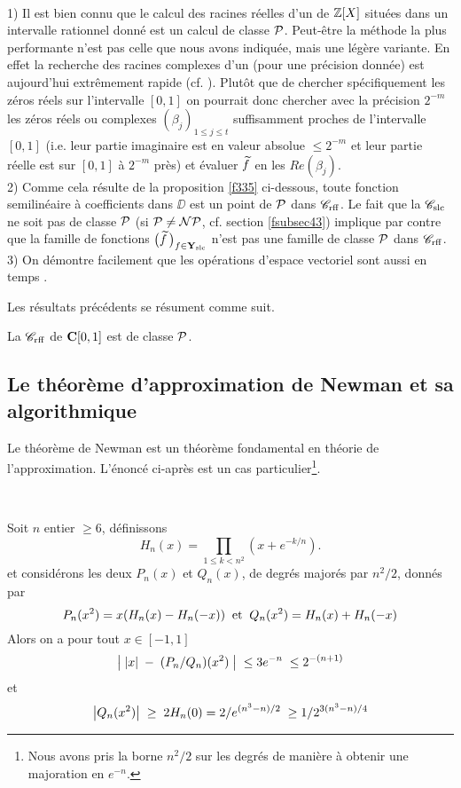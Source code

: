 \begin{fremarks} \label{f328}~\\
1)	Il est bien connu que le calcul des racines réelles d'un \pol de  
$\mathbb {Z}[X]$  situées dans un intervalle rationnel donné est un calcul de 
classe  ${\cal P}$. Peut-être la méthode la plus performante n'est pas celle que 
nous avons indiquée, mais une légère variante. 
En effet la recherche des 
racines complexes d'un \pol (pour une précision donnée) est aujourd'hui 
extrêmement rapide (cf. \cite {fPa}). 
Plutôt que de chercher spécifiquement les zéros réels sur l'intervalle $[0,1]$ on pourrait donc chercher avec la précision  $2^{-m}$  les zéros réels ou complexes  $(\beta_j)_{1 \leq j \leq t}$ suffisamment proches de l'intervalle   $[0,1]$    (i.e. leur partie imaginaire est en valeur absolue  $\leq2^{-m}$ et leur partie réelle est sur  $[0,1]$  à   $2^{-m}$  près) et évaluer $\widetilde{f}$ en les  $Re(\beta_j)$.\\    
2) Comme cela résulte de la proposition \ref{f335} ci-dessous,  toute 
fonction semilinéaire à coefficients dans $\DD$  est un point de \com  
${\cal P}$ dans ${{{\mathscr C}}_{\rm rff}}$. 
Le fait que la \pres ${{{\mathscr C}}_{\rm slc}}$ ne soit pas de classe  ${\cal P}$ (si ${\cal P}\neq{\cal NP}$, cf. section \ref{fsubsec43}) implique par contre que la famille de fonctions $\big(\widetilde{f}\,\big)_{f \in {{\bf Y}_{\rm slc}} }$ n'est pas une famille de classe ${\cal P}$   dans ${{{\mathscr C}}_{\rm rff}}$.\\
3) On démontre facilement que les opérations d'espace vectoriel sont aussi en temps \poll. 
\end{fremarks}

Les résultats précédents se résument comme suit.

\begin{ftheorem} \label{f329}
La \pres  ${{{\mathscr C}}_{\rm rff}}$  de  ${{\bf C}[0,1]}$  est de classe  ${\cal P}$.
\end{ftheorem}

\subsection{Le théorème d'approximation de Newman et sa \com 
algorithmique}\label{fsubsec33}
Le théorème de Newman est un théorème fondamental en théorie de 
l'approximation. L'énoncé ci-après est un cas particulier{\footnote{Nous 
avons pris la borne  $n^2/2$ sur les degrés de manière à obtenir une 
majoration en  $e^{-n}.$}}.

\begin{ftheorem} \label{f331}~  

\noindent   
Soit  $n$  entier  $\geq  6$,   définissons
\[
H_n(x) = \prod_{ 1 \leq k < n^2}(x + e^{-k/n}).
\]
et considérons les deux \pols  $P_n(x)$  et 
  $Q_n(x)$, de degrés majorés par  $n^2/2$,  donnés par
\[
P_n(x^2) = x(H_n(x) - H_n(-x)) \; \; \hbox{et} \; \; Q_n(x^2) = H_n(x) + H_n(-x)
\]
Alors on a pour tout  $x \in  [-1,1]$  
\[
\big|{ \; \left|{x}\right|\; - \;(P_n/Q_n)(x^2) \; }\big| \; \leq 3e^{-n}\; \leq 2^{-(n+1)}
\]
et 
\[\big|{Q_n(x^2)}\big|\; \geq \;2H_n(0) = 2/e^{(n^3 - n)/2} \;\geq 1/2^{3(n^3 - 
n)/4} 
\]
\end{ftheorem}

